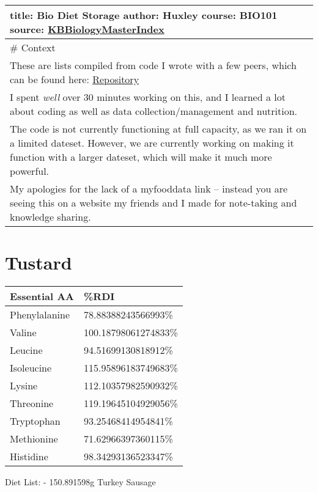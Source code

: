 \documentclass[letterpaper]{article}
\date{\today}
\title{}
\renewcommand{\tableofcontents}{}
\begin{document}
\tableofcontents

\begin{center}
\begin{tabular}{l}
title: Bio Diet Storage author: Huxley course: BIO101 source: \href{KBBiologyMasterIndex.org}{KBBiologyMasterIndex}\\
\hline
\# Context\\
These are lists compiled from code I wrote with a few peers, which can be found here: \href{https://github.com/SkoolNotes/diet-finder8000superplus}{Repository}\\
I spent \emph{well} over 30 minutes working on this, and I learned a lot about coding as well as data collection/management and nutrition.\\
The code is not currently functioning at full capacity, as we ran it on a limited dateset. However, we are currently working on making it function with a larger dateset, which will make it much more powerful.\\
My apologies for the lack of a myfooddata link -- instead you are seeing this on a website my friends and I made for note-taking and knowledge sharing.\\
\end{tabular}
\end{center}

\section{Tustard}
\label{sec:orgfd48835}
\begin{center}
\begin{tabular}{ll}
Essential AA & \%RDI\\
\hline
Phenylalanine & 78.88388243566993\%\\
Valine & 100.18798061274833\%\\
Leucine & 94.51699130818912\%\\
Isoleucine & 115.95896183749683\%\\
Lysine & 112.10357982590932\%\\
Threonine & 119.19645104929056\%\\
Tryptophan & 93.25468414954841\%\\
Methionine & 71.62966397360115\%\\
Histidine & 98.34293136523347\%\\
\end{tabular}
\end{center}

Diet List: - 150.891598g Turkey Sausage
\end{document}
